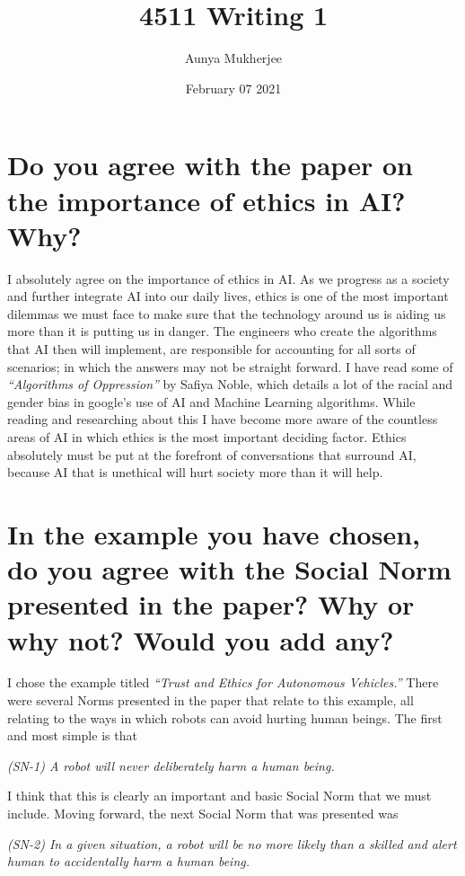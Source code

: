 \documentclass{article}
\title{4511 Writing 1}
\author{Aunya Mukherjee}
\date{February 07 2021}
\begin{document}
\maketitle

\section{Do you agree with the paper on the importance of ethics in AI? Why?}

I absolutely agree on the importance of ethics in AI. As we progress as a society and further integrate AI into our daily lives, ethics is one of the most important dilemmas we must face to make sure that the technology around us is aiding us more than it is putting us in danger. The engineers who create the algorithms that AI then will implement, are responsible for accounting for all sorts of scenarios; in which the answers may not be straight forward. I have read some of {\it“Algorithms of Oppression”} by Safiya Noble, which details a lot of the racial and gender bias in google’s use of AI and Machine Learning algorithms. While reading and researching about this I have become more aware of the countless areas of AI in which ethics is the most important deciding factor. Ethics absolutely must be put at the forefront of conversations that surround AI, because AI that is unethical will hurt society more than it will help.



\section{In the example you have chosen, do you agree with the Social Norm presented in the paper?  Why or why not? Would you add any?}

I chose the example titled {\it“Trust and Ethics for Autonomous Vehicles.”} There were several Norms presented in the paper that relate to this example, all relating to the ways in which robots can avoid hurting human beings. The first and most simple is that 

\bigskip

{\it (SN-1) A robot will never deliberately harm a human being.}

\bigskip

I think that this is clearly an important and basic Social Norm that we must include. Moving forward, the next Social Norm that was presented was

\bigskip

{\it (SN-2) In a given situation, a robot will be no more likely than a skilled and alert human to accidentally harm a human being.} 
\end{document}
